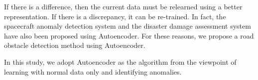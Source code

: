 \documentclass[paper]{ieice}
\begin{document}
%
If there is a difference, then the current data must be relearned using a better representation.
If there is a discrepancy, it can be re-trained.
%
In fact, the spacecraft anomaly detection system \cite{sakurada} and the disaster damage assessment system \cite{kinami} have also been proposed using Autoencoder.
%
For these reasons, we propose a road obstacle detection method using Autoencoder.
%
\par
%
%
In this study, we adopt Autoencoder as the algorithm from the viewpoint of learning with normal data only and identifying anomalies.
%


\begin{thebibliography}{99}%
\bibitem{}
\end{thebibliography}

\end{document}
